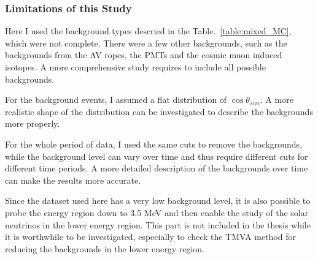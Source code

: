 

\subsubsection{Limitations of this Study}
Here I used the background types descried in the Table.~\ref{table:mixed_MC}, which were not complete. There were a few other backgrounds, such as the backgrounds from the AV ropes, the PMTs and the cosmic muon induced isotopes. A more comprehensive study requires to include all possible backgrounds.

For the background events, I assumed a flat distribution of $\cos\theta_{sun}$. A more realistic shape of the distribution can be investigated to describe the backgrounds more properly.

For the whole period of data, I used the same cuts to remove the backgrounds, while the background level can vary over time and thus require different cuts for different time periods. A more detailed description of the backgrounds over time can make the results more accurate.

Since the dataset used here has a very low background level, it is also possible to probe the energy region down to 3.5 MeV and then enable the study of the solar neutrinos in the lower energy region. This part is not included in the thesis while it is worthwhile to be investigated, especially to check the TMVA method for reducing the backgrounds in the lower energy region.